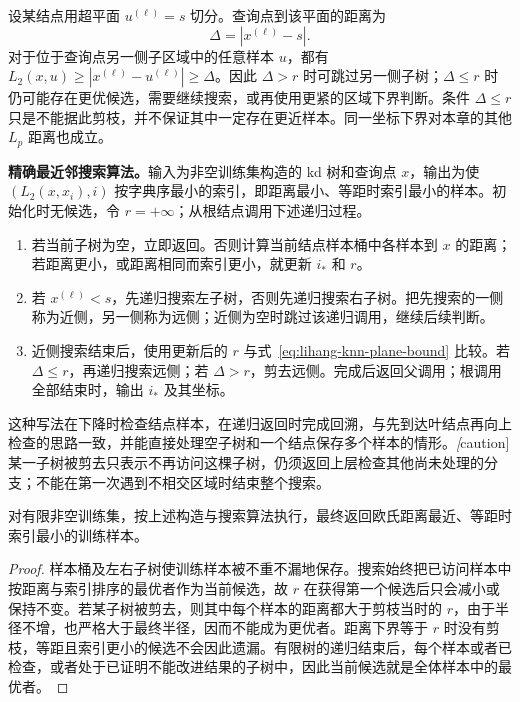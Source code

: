 设某结点用超平面 $u^{(\ell)}=s$ 切分。查询点到该平面的距离为
\begin{equation}
  \Delta=|x^{(\ell)}-s|.
  \label{eq:lihang-knn-plane-bound}
\end{equation}
对于位于查询点另一侧子区域中的任意样本 $u$，都有 $L_2(x,u)\geq|x^{(\ell)}-u^{(\ell)}|\geq\Delta$。因此 $\Delta>r$ 时可跳过另一侧子树；$\Delta\leq r$ 时仍可能存在更优候选，需要继续搜索，或再使用更紧的区域下界判断。条件 $\Delta\leq r$ 只是不能据此剪枝，并不保证其中一定存在更近样本。同一坐标下界对本章的其他 $L_p$ 距离也成立。

\textbf{精确最近邻搜索算法。}输入为非空训练集构造的 kd 树和查询点 $x$，输出为使 $(L_2(x,x_i),i)$ 按字典序最小的索引，即距离最小、等距时索引最小的样本。初始化时无候选，令 $r=+\infty$；从根结点调用下述递归过程。
\begin{enumerate}
  \item 若当前子树为空，立即返回。否则计算当前结点样本桶中各样本到 $x$ 的距离；若距离更小，或距离相同而索引更小，就更新 $i_\ast$ 和 $r$。
  \item 若 $x^{(\ell)}<s$，先递归搜索左子树，否则先递归搜索右子树。把先搜索的一侧称为近侧，另一侧称为远侧；近侧为空时跳过该递归调用，继续后续判断。
  \item 近侧搜索结束后，使用更新后的 $r$ 与式~\eqref{eq:lihang-knn-plane-bound} 比较。若 $\Delta\leq r$，再递归搜索远侧；若 $\Delta>r$，剪去远侧。完成后返回父调用；根调用全部结束时，输出 $i_\ast$ 及其坐标。
\end{enumerate}
这种写法在下降时检查结点样本，在递归返回时完成回溯，与先到达叶结点再向上检查的思路一致，并能直接处理空子树和一个结点保存多个样本的情形。\emph[caution]{某一子树被剪去只表示不再访问这棵子树，仍须返回上层检查其他尚未处理的分支；不能在第一次遇到不相交区域时结束整个搜索。}

\begin{proposition}
\label{prop:lihang-knn-kdtree-correct}
对有限非空训练集，按上述构造与搜索算法执行，最终返回欧氏距离最近、等距时索引最小的训练样本。
\end{proposition}
\begin{proof}
样本桶及左右子树使训练样本被不重不漏地保存。搜索始终把已访问样本中按距离与索引排序的最优者作为当前候选，故 $r$ 在获得第一个候选后只会减小或保持不变。若某子树被剪去，则其中每个样本的距离都大于剪枝当时的 $r$，由于半径不增，也严格大于最终半径，因而不能成为更优者。距离下界等于 $r$ 时没有剪枝，等距且索引更小的候选不会因此遗漏。有限树的递归结束后，每个样本或者已检查，或者处于已证明不能改进结果的子树中，因此当前候选就是全体样本中的最优者。
\end{proof}

